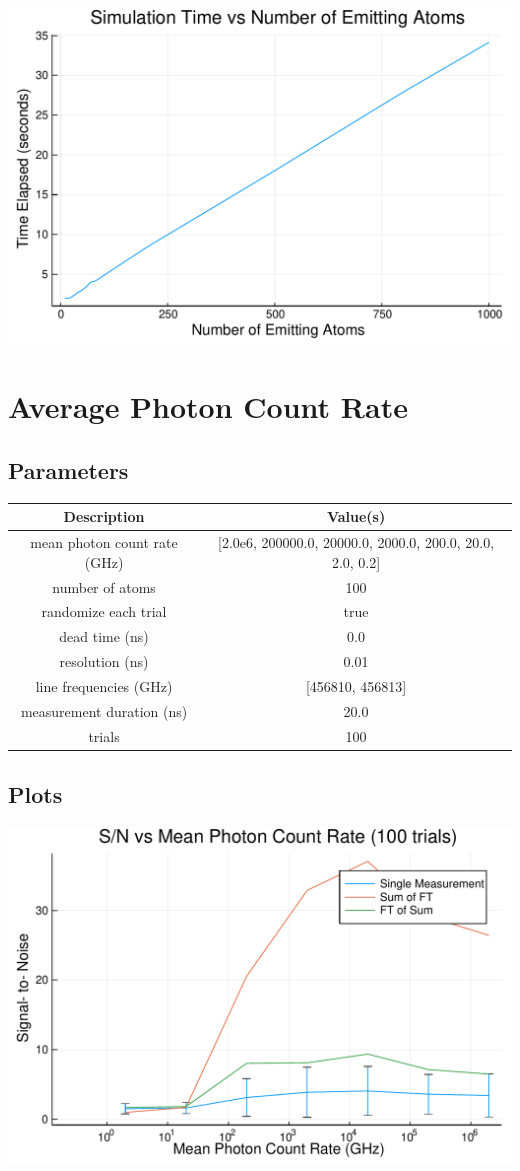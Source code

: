 \documentclass[12pt,a4paper]{article}
\begin{document}
\includegraphics[width=\linewidth]{jl_PKMVtA/simnb_4_1.pdf}

\section{Average Photon Count Rate}


\subsection{Parameters}
\begin{tabular}
{c | c}
Description & Value(s) \\
\hline
mean photon count rate (GHz) & [2.0e6, 200000.0, 20000.0, 2000.0, 200.0, 20.0, 2.0, 0.2] \\
number of atoms & 100 \\
randomize each trial & true \\
dead time (ns) & 0.0 \\
resolution (ns) & 0.01 \\
line frequencies (GHz) & [456810, 456813] \\
measurement duration (ns) & 20.0 \\
trials & 100 \\
\end{tabular}
\subsection{Plots}

\includegraphics[width=\linewidth]{jl_PKMVtA/simnb_6_1.pdf}
\end{document}
